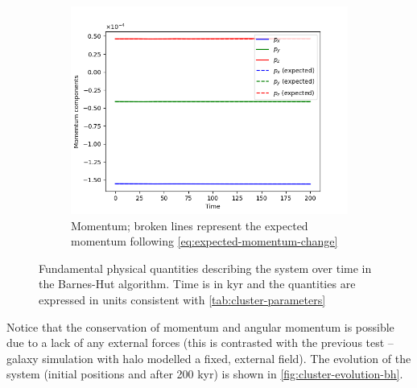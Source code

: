 \begin{figure}[htp]
    \vspace{0.5cm}

    \begin{subfigure}[b]{0.45\textwidth}
        \centering
        \includegraphics[width=\textwidth]{img/bh-cluster/momentum.png}
        \caption{Momentum; broken lines represent the expected momentum following \autoref{eq:expected-momentum-change}}
        \label{fig:physical-quantities-bh-cluster-sub3}
    \end{subfigure}

    \caption{Fundamental physical quantities describing the system over time in the Barnes-Hut algorithm.
        Time is in kyr and the quantities are expressed in units consistent with \autoref{tab:cluster-parameters}}
    \label{fig:physical-quantities-bh-cluster}
\end{figure}
Notice that the conservation of momentum and angular momentum is possible due to a lack of any external forces (this is contrasted with the previous test -- galaxy simulation with halo modelled a fixed, external field).
The evolution of the system (initial positions and after 200 kyr) is shown in \autoref{fig:cluster-evolution-bh}.

